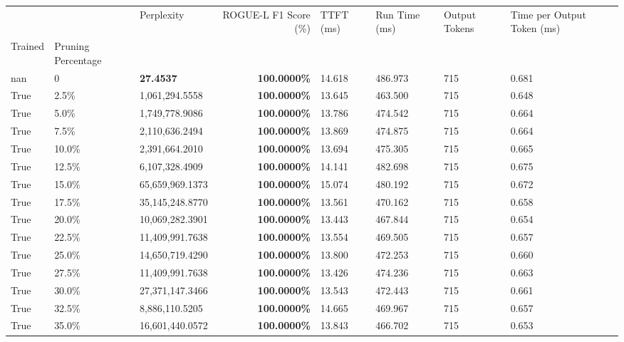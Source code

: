 \begin{table}[H]
\label{tab:evaluation-pipeline-2-trained}
\begin{tabular}{lllrllll}
\toprule
 &  & Perplexity & ROGUE-L F1 Score (\%) & TTFT (ms) & Run Time (ms) & Output Tokens & Time per Output Token (ms) \\
Trained & Pruning Percentage &  &  &  &  &  &  \\
\midrule
nan & 0 & \bfseries 27.4537 & \bfseries 100.0000\% & 14.618 & 486.973 & 715 & 0.681 \\
\cline{1-8}
True & 2.5\% & 1,061,294.5558 & \bfseries \color{red} 100.0000\% & 13.645 & 463.500 & 715 & 0.648 \\
\cline{1-8}
True & 5.0\% & 1,749,778.9086 & \bfseries \color{red} 100.0000\% & 13.786 & 474.542 & 715 & 0.664 \\
\cline{1-8}
True & 7.5\% & 2,110,636.2494 & \bfseries \color{red} 100.0000\% & 13.869 & 474.875 & 715 & 0.664 \\
\cline{1-8}
True & 10.0\% & 2,391,664.2010 & \bfseries \color{red} 100.0000\% & 13.694 & 475.305 & 715 & 0.665 \\
\cline{1-8}
True & 12.5\% & 6,107,328.4909 & \bfseries \color{red} 100.0000\% & 14.141 & 482.698 & 715 & 0.675 \\
\cline{1-8}
True & 15.0\% & 65,659,969.1373 & \bfseries \color{red} 100.0000\% & 15.074 & 480.192 & 715 & 0.672 \\
\cline{1-8}
True & 17.5\% & 35,145,248.8770 & \bfseries \color{red} 100.0000\% & 13.561 & 470.162 & 715 & 0.658 \\
\cline{1-8}
True & 20.0\% & 10,069,282.3901 & \bfseries \color{red} 100.0000\% & 13.443 & 467.844 & 715 & 0.654 \\
\cline{1-8}
True & 22.5\% & 11,409,991.7638 & \bfseries \color{red} 100.0000\% & 13.554 & 469.505 & 715 & 0.657 \\
\cline{1-8}
True & 25.0\% & 14,650,719.4290 & \bfseries \color{red} 100.0000\% & 13.800 & 472.253 & 715 & 0.660 \\
\cline{1-8}
True & 27.5\% & 11,409,991.7638 & \bfseries \color{red} 100.0000\% & 13.426 & 474.236 & 715 & 0.663 \\
\cline{1-8}
True & 30.0\% & 27,371,147.3466 & \bfseries \color{red} 100.0000\% & 13.543 & 472.443 & 715 & 0.661 \\
\cline{1-8}
True & 32.5\% & 8,886,110.5205 & \bfseries \color{red} 100.0000\% & 14.665 & 469.967 & 715 & 0.657 \\
\cline{1-8}
True & 35.0\% & 16,601,440.0572 & \bfseries \color{red} 100.0000\% & 13.843 & 466.702 & 715 & 0.653 \\

\end{tabular}
\end{table}
